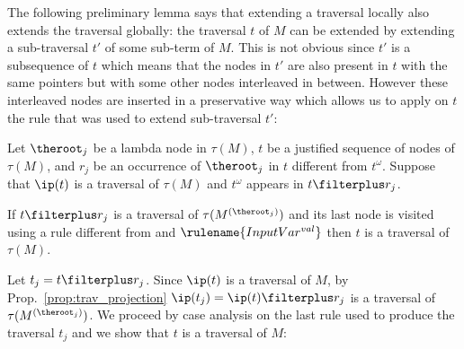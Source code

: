 The following preliminary lemma says that extending a traversal locally also extends the
traversal globally: the traversal $t$ of $M$ can be extended by
extending a sub-traversal $t'$ of some sub-term of $M$. This is
not obvious since $t'$ is a subsequence of $t$ which means that the
nodes in $t'$ are also present in $t$ with the same pointers but
with some other nodes interleaved in between. However these
interleaved nodes are inserted in a preservative way which allows us
to apply on $t$ the rule that was used to extend sub-traversal $t'$:
\begin{lemma}
\label{lem:subtraversal_progression} Let $\theroot_j$ be a lambda node in $\tau(M)$,
$t$ be a justified sequence of nodes of $\tau(M)$, and $r_j$ be an occurrence of $\theroot_j$ in $t$ different from $t^\omega$.
Suppose that $\ip(t)$ is a traversal of $\tau(M)$ and $t^\omega$ appears in $t\filterplus r_j$.

If $t \filterplus r_j$ is a traversal of $\tau(M^{(\theroot_j)})$
and its last node is visited using a rule different from  and $\rulename{InputVar^{val}}$
then $t$ is a traversal of $\tau(M)$.
\end{lemma}
\proof Let $t_j = t \filterplus r_j$. Since $\ip(t)$ is a traversal of
$M$, by Prop.\ \ref{prop:trav_projection} $\ip(t_j) = \ip(t)
\filterplus r_j$ is a traversal of $\tau(M^{(\theroot_j)})$.
  We proceed by case analysis on the last rule used to produce the traversal $t_j$ and we show that $t$ is a traversal of $M$:
